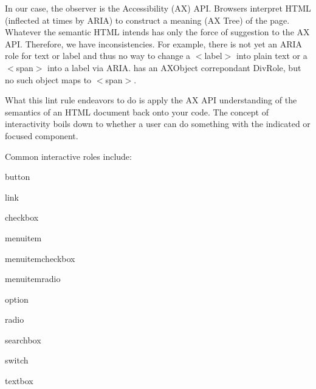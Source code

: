 In our case, the observer is the Accessibility (AX) A\+PI. Browsers interpret H\+T\+ML (inflected at times by A\+R\+IA) to construct a meaning (AX Tree) of the page. Whatever the semantic H\+T\+ML intends has only the force of suggestion to the AX A\+PI. Therefore, we have inconsistencies. For example, there is not yet an A\+R\+IA role for {\ttfamily text} or {\ttfamily label} and thus no way to change a {\ttfamily $<$label$>$} into plain text or a {\ttfamily $<$span$>$} into a label via A\+R\+IA. \textquotesingle{}\textquotesingle{} has an A\+X\+Object correpondant {\ttfamily Div\+Role}, but no such object maps to {\ttfamily $<$span$>$}.

What this lint rule endeavors to do is apply the AX A\+PI understanding of the semantics of an H\+T\+ML document back onto your code. The concept of interactivity boils down to whether a user can do something with the indicated or focused component.

Common interactive roles include\+:


\begin{DoxyEnumerate}
\item {\ttfamily button}
\end{DoxyEnumerate}
\begin{DoxyEnumerate}
\item {\ttfamily link}
\end{DoxyEnumerate}
\begin{DoxyEnumerate}
\item {\ttfamily checkbox}
\end{DoxyEnumerate}
\begin{DoxyEnumerate}
\item {\ttfamily menuitem}
\end{DoxyEnumerate}
\begin{DoxyEnumerate}
\item {\ttfamily menuitemcheckbox}
\end{DoxyEnumerate}
\begin{DoxyEnumerate}
\item {\ttfamily menuitemradio}
\end{DoxyEnumerate}
\begin{DoxyEnumerate}
\item {\ttfamily option}
\end{DoxyEnumerate}
\begin{DoxyEnumerate}
\item {\ttfamily radio}
\end{DoxyEnumerate}
\begin{DoxyEnumerate}
\item {\ttfamily searchbox}
\end{DoxyEnumerate}
\begin{DoxyEnumerate}
\item {\ttfamily switch}
\end{DoxyEnumerate}
\begin{DoxyEnumerate}
\item {\ttfamily textbox}
\end{DoxyEnumerate}

